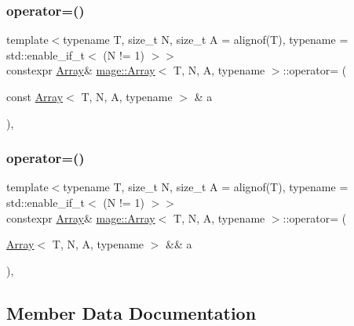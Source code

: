 \subsubsection{\texorpdfstring{operator=()}{operator=()}\hspace{0.1cm}{\footnotesize\ttfamily [1/2]}}
{\footnotesize\ttfamily template$<$typename T, size\+\_\+t N, size\+\_\+t A = alignof(\+T), typename  = std\+::enable\+\_\+if\+\_\+t$<$ (\+N != 1) $>$$>$ \\
constexpr \mbox{\hyperlink{structmage_1_1_array}{Array}}\& \mbox{\hyperlink{structmage_1_1_array}{mage\+::\+Array}}$<$ T, N, A, typename $>$\+::operator= (\begin{DoxyParamCaption}\item[{const \mbox{\hyperlink{structmage_1_1_array}{Array}}$<$ T, N, A, typename $>$ \&}]{a }\end{DoxyParamCaption})\hspace{0.3cm}{\ttfamily [default]}, {\ttfamily [noexcept]}}

\mbox{\label{structmage_1_1_array_ae90a7beb10b5edc39331e465af0d1acc}} 
\subsubsection{\texorpdfstring{operator=()}{operator=()}\hspace{0.1cm}{\footnotesize\ttfamily [2/2]}}
{\footnotesize\ttfamily template$<$typename T, size\+\_\+t N, size\+\_\+t A = alignof(\+T), typename  = std\+::enable\+\_\+if\+\_\+t$<$ (\+N != 1) $>$$>$ \\
constexpr \mbox{\hyperlink{structmage_1_1_array}{Array}}\& \mbox{\hyperlink{structmage_1_1_array}{mage\+::\+Array}}$<$ T, N, A, typename $>$\+::operator= (\begin{DoxyParamCaption}\item[{\mbox{\hyperlink{structmage_1_1_array}{Array}}$<$ T, N, A, typename $>$ \&\&}]{a }\end{DoxyParamCaption})\hspace{0.3cm}{\ttfamily [default]}, {\ttfamily [noexcept]}}



\subsection{Member Data Documentation}
\mbox{\label{structmage_1_1_array_aead6104ec6173aed5755a261b0a82b82}} 
